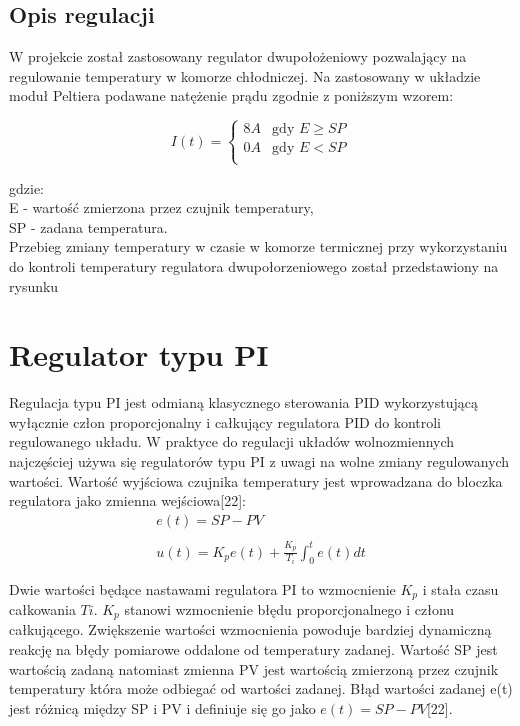 \documentclass[oneside]{mgr}
\begin{document}
\subsection{Opis regulacji}
W projekcie został zastosowany regulator dwupołożeniowy pozwalający na regulowanie temperatury w komorze chłodniczej. Na zastosowany w układzie moduł Peltiera podawane natężenie prądu zgodnie z poniższym wzorem:
\begin{center}
\begin{equation*}
    I(t) = \left\{ \begin{array}{ll}
    8A & \textrm{gdy $E \geq SP$}\\
    0A & \textrm{gdy $E < SP$}\\
\end{array} \right.
\end{equation*}
\end{center}
gdzie: \\
E - wartość zmierzona przez czujnik temperatury, \\
SP - zadana temperatura. \\

Przebieg zmiany temperatury w czasie w komorze termicznej przy wykorzystaniu do kontroli temperatury regulatora dwupołorzeniowego został przedstawiony na rysunku

\section{Regulator typu PI}
Regulacja typu PI jest odmianą klasycznego sterowania PID wykorzystującą wyłącznie człon proporcjonalny i całkujący regulatora PID do kontroli regulowanego układu. W praktyce do regulacji układów wolnozmiennych najczęściej używa się regulatorów typu PI z uwagi na wolne zmiany regulowanych wartości. Wartość wyjściowa czujnika temperatury jest wprowadzana do bloczka regulatora jako zmienna wejściowa[22]:
\begin{equation*}
    \begin{array}{c}
        e(t) = SP - PV \\ \\
        u(t) = K_{p}e(t) + \frac{K_p}{T_i} \int_{0}^t e(t)dt \\ \\
    \end{array}
\end{equation*}
Dwie wartości będące nastawami regulatora PI to wzmocnienie $K_p$ i stała czasu całkowania $Ti$. $K_p$ stanowi wzmocnienie błędu proporcjonalnego i członu całkującego. Zwiększenie wartości wzmocnienia powoduje bardziej dynamiczną reakcję na błędy pomiarowe oddalone od temperatury zadanej. Wartość SP jest wartością zadaną natomiast zmienna PV jest wartością zmierzoną przez czujnik temperatury która może odbiegać od wartości zadanej. Błąd wartości zadanej e(t) jest różnicą między SP i PV i definiuje się go jako $e(t) = SP-PV$[22].
\end{document}
